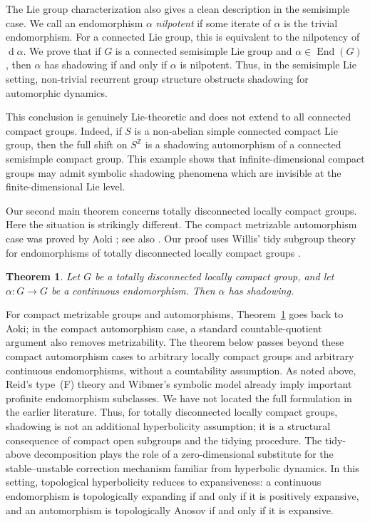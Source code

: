 \documentclass[12pt]{amsart}
\newtheorem{maintheorem}{Theorem}
\theoremstyle{definition}
\numberwithin{equation}{section}
\theoremstyle{remark}
\DeclareMathOperator{\di}{d}
\begin{document}
The Lie group characterization also gives a clean description in the
semisimple case. We call an endomorphism $\alpha$ \emph{nilpotent} if some iterate
of $\alpha$ is the trivial endomorphism. For a connected Lie group, this is
equivalent to the nilpotency of $\di\alpha$. We prove that if $G$ is a
connected semisimple Lie group and $\alpha\in\operatorname{End}(G)$, then
$\alpha$ has shadowing if and only if $\alpha$ is nilpotent. Thus, in the
semisimple Lie setting, non-trivial recurrent group structure obstructs
shadowing for automorphic dynamics.

This conclusion is genuinely Lie-theoretic and does not extend to all
connected compact groups. Indeed, if $S$ is a non-abelian simple connected
compact Lie group, then the full shift on $S^{\mathbb Z}$ is a shadowing
automorphism of a connected semisimple compact group. This example shows
that infinite-dimensional compact groups may admit symbolic shadowing
phenomena which are invisible at the finite-dimensional Lie level.

Our second main theorem concerns totally disconnected locally compact
groups. Here the situation is strikingly different. The compact metrizable
automorphism case was proved by Aoki
\cite[Application~2, pp.~170--172]{AokiSplitting1985}; see also
\cite[Theorem~D]{AokiDense1985}. Our proof uses Willis' tidy subgroup theory for
endomorphisms of totally disconnected locally compact groups
\cite{Willis1994,Willis2001,WillisEndomorphisms}.

\begin{maintheorem}\label{thm:main-tdlc}
Let $G$ be a totally disconnected locally compact group, and let
$\alpha:G\to G$ be a continuous endomorphism. Then $\alpha$ has shadowing.
\end{maintheorem}

For compact metrizable groups and automorphisms,
Theorem~\ref{thm:main-tdlc} goes back to Aoki; in the compact automorphism
case, a standard countable-quotient argument also removes metrizability. The
theorem below passes beyond these compact automorphism cases to arbitrary
locally compact groups and arbitrary continuous endomorphisms, without a
countability assumption. As noted above, Reid's type~(F) theory and Wibmer's symbolic
model already imply important profinite endomorphism subclasses. We have not
located the full formulation in the earlier literature. Thus, for totally
disconnected locally
compact groups, shadowing is not an additional hyperbolicity assumption;
it is a structural consequence of compact open subgroups and the tidying
procedure. The tidy-above decomposition plays the role of a
zero-dimensional substitute for the stable--unstable correction mechanism
familiar from hyperbolic dynamics. In this setting, topological
hyperbolicity reduces to expansiveness: a continuous endomorphism is
topologically expanding if and only if it is positively expansive, and an
automorphism is topologically Anosov if and only if it is expansive.
\end{document}
